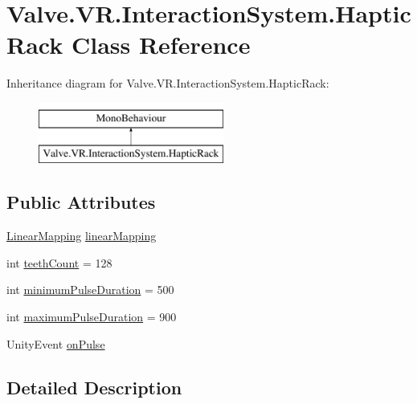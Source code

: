 \hypertarget{class_valve_1_1_v_r_1_1_interaction_system_1_1_haptic_rack}{}\section{Valve.\+V\+R.\+Interaction\+System.\+Haptic\+Rack Class Reference}
\label{class_valve_1_1_v_r_1_1_interaction_system_1_1_haptic_rack}
Inheritance diagram for Valve.\+V\+R.\+Interaction\+System.\+Haptic\+Rack\+:\begin{figure}[H]
\begin{center}
\leavevmode
\includegraphics[height=2.000000cm]{class_valve_1_1_v_r_1_1_interaction_system_1_1_haptic_rack}
\end{center}
\end{figure}
\subsection*{Public Attributes}
\begin{DoxyCompactItemize}
\item 
\mbox{\hyperlink{class_valve_1_1_v_r_1_1_interaction_system_1_1_linear_mapping}{Linear\+Mapping}} \mbox{\hyperlink{class_valve_1_1_v_r_1_1_interaction_system_1_1_haptic_rack_a665f0329fcdd77f679dcce3ef9bc9d14}{linear\+Mapping}}
\item 
int \mbox{\hyperlink{class_valve_1_1_v_r_1_1_interaction_system_1_1_haptic_rack_af0af6b8328a17e2f2056a19fa4944948}{teeth\+Count}} = 128
\item 
int \mbox{\hyperlink{class_valve_1_1_v_r_1_1_interaction_system_1_1_haptic_rack_a13deb2304d856fcb88e3b784538ddd49}{minimum\+Pulse\+Duration}} = 500
\item 
int \mbox{\hyperlink{class_valve_1_1_v_r_1_1_interaction_system_1_1_haptic_rack_a9d7205ed4c8bf7ad634f224e3cfc6f0f}{maximum\+Pulse\+Duration}} = 900
\item 
Unity\+Event \mbox{\hyperlink{class_valve_1_1_v_r_1_1_interaction_system_1_1_haptic_rack_a19cca547466e55f45d5e5faf2e22cd13}{on\+Pulse}}
\end{DoxyCompactItemize}


\subsection{Detailed Description}



